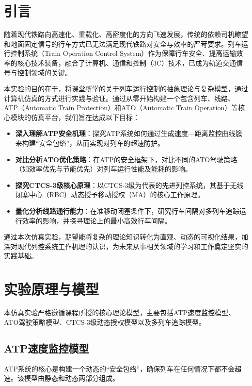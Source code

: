 \documentclass[11pt, a4paper]{ctexart}
\begin{document}
\section{引言}

随着现代铁路向高速化、重载化、高密度化的方向飞速发展，传统的依赖司机瞭望和地面固定信号的行车方式已无法满足现代铁路对安全与效率的严苛要求。列车运行控制系统（Train Operation Control System）作为保障行车安全、提高运输效率的核心技术装备，融合了计算机、通信和控制（3C）技术，已成为轨道交通信号与控制领域的关键。

本实验的目的在于，将课堂所学的关于列车运行控制的抽象理论与复杂模型，通过计算机仿真的方式进行实践与验证。通过从零开始构建一个包含列车、线路、ATP（Automatic Train Protection）和ATO（Automatic Train Operation）等核心模块的仿真平台，我们旨在达成以下目标：
\begin{itemize}
    \item \textbf{深入理解ATP安全机理}：探究ATP系统如何通过生成速度—距离监控曲线簇来构建“安全包络”，从而实现对列车的超速防护。
    \item \textbf{对比分析ATO优化策略}：在ATP的安全框架下，对比不同的ATO驾驶策略（如效率优先与节能优先）对列车运行性能及能耗的影响。
    \item \textbf{探究CTCS-3级核心原理}：以CTCS-3级为代表的先进列控系统，其基于无线闭塞中心（RBC）动态授予移动授权（MA）的核心工作原理。
    \item \textbf{量化分析线路通行能力}：在准移动闭塞条件下，研究行车间隔对多列车追踪运行效率的影响，并探寻理论上的最小高效行车间隔。
\end{itemize}
通过本次仿真实验，期望能将复杂的理论知识转化为直观、动态的可视化结果，加深对现代列控系统工作机理的认识，为未来从事相关领域的学习和工作奠定坚实的实践基础。

\section{实验原理与模型}

本仿真实验严格遵循课程所授的核心理论模型，主要包括ATP速度监控模型、ATO驾驶策略模型、CTCS-3级动态授权模型以及多列车追踪模型。

\subsection{ATP速度监控模型}

ATP系统的核心是构建一个动态的“安全包络”，确保列车在任何情况下都不会超速。该模型由静态和动态两部分组成。
\end{document}

